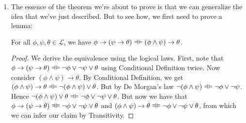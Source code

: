 \begin{enumerate}[\thesection.1]
		\item The essence of the theorem we're about to prove is that we can generalize the idea that we've just described. But to see how, we first need to prove a lemma:
		\begin{lemma}
		For all $\phi,\psi,\theta\in\mathcal{L}$, we have $\phi\to(\psi\to\theta)\equi (\phi\land\psi)\to\theta$.
		\end{lemma}
		\begin{proof}
		We derive the equivalence using the logical laws. First, note that $\phi\to(\psi\to\theta)\equi \neg\phi\lor \neg \psi\lor \theta$ using Conditional Definition twice. Now consider $(\phi\land\psi)\to\theta$. By Conditional Definition, we get $(\phi\land\psi)\to\theta\equi \neg(\phi\land\psi)\lor\theta$. But by De Morgan's law $\neg(\phi\land\psi)\equi \neg\phi\lor\neg\psi$. Hence $\neg(\phi\land\psi)\lor\theta\equi  \neg\phi\lor\neg\psi\lor\theta$. But now we have that $\phi\to(\psi\to\theta)\equi \neg\phi\lor \neg \psi\lor \theta$ and $(\phi\land\psi)\to\theta\equi  \neg\phi\lor\neg\psi\lor\theta$, from which we can infer our claim by Transitivity. 
	

\end{proof}
\end{enumerate}

